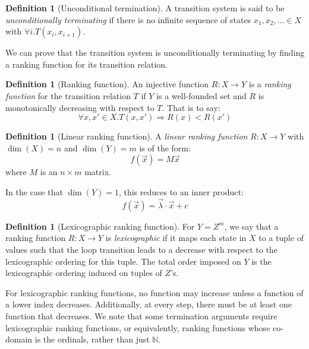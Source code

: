 \documentclass[preprint]{sigplanconf}
\theoremstyle{definition}
\newtheorem{definition}[theorem]{Definition}
\begin{document}
\begin{definition}[Unconditional termination]
A transition system is said to be \emph{unconditionally terminating} if there is no infinite sequence of states
$x_1, x_2, \ldots \in X$ with $\forall i . T(x_i, x_{i+1})$.  
\end{definition}

We can prove that the transition system is unconditionally terminating by finding a ranking function for its transition relation.

\begin{definition}[Ranking function]
An injective function ${R:X\to Y}$ is a \emph{ranking function} for the transition relation $T$ if $Y$ is a well-founded set and 
$R$ is monotonically decreasing with respect to $T$.  That is
to say:
$$\forall x, x' \in X. T(x, x') \Rightarrow R(x) < R(x')$$
\end{definition}

\begin{definition}[Linear ranking function]
A \emph{linear ranking function} $R: X \to Y$ 
with $\dim(X) = n$ and $\dim(Y) = m$ is of the form: $$f(\vec{x}) = M\vec{x}$$ where
$M$ is an $n \times m$ matrix.
\end{definition}

In the case that $\dim(Y) = 1$, this reduces to an inner product:
$$f(\vec{x}) = \vec{\lambda} \cdotp \vec{x} + c$$

\begin{definition}[Lexicographic ranking function]
For $Y = Z^m$, we say that a ranking function $R: X \to Y$ is \emph{lexicographic}
if it maps each state in $X$ to a tuple of values such that the loop transition leads to a decrease with
respect to the lexicographic ordering for this tuple.
The total order imposed on $Y$ is the lexicographic ordering
induced on tuples of $Z$'s. 
\end{definition}

For lexicographic ranking functions, no function may increase unless a function of a lower index decreases.
Additionally, at every step, there must be at least one function that decreases.
We note that some termination arguments require lexicographic ranking functions, or equivalently, ranking functions
whose co-domain is the ordinals, rather than just $\mathbb{N}$.


\end{document}
